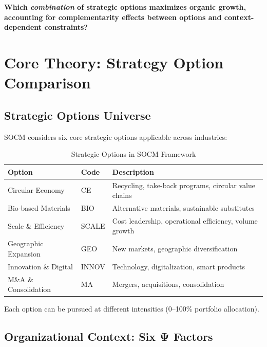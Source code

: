 \begin{tcolorbox}[colback=red!5!white, colframe=red!75!black,
    title=The Fundamental Question]
\textbf{Which \textit{combination} of strategic options maximizes organic growth, accounting for complementarity effects between options and context-dependent constraints?}
\end{tcolorbox}

\section{Core Theory: Strategy Option Comparison}
\label{sec:socm-theory}

\subsection{Strategic Options Universe}
\label{subsec:socm-options}

SOCM considers six core strategic options applicable across industries:

\begin{table}[htbp]
\centering
\caption{Strategic Options in SOCM Framework}
\label{tab:socm-options}
\renewcommand{\arraystretch}{1.4}
\begin{tabular}{@{}llp{6cm}@{}}
\toprule
\textbf{Option} & \textbf{Code} & \textbf{Description} \\
\midrule
Circular Economy & CE & Recycling, take-back programs, circular value chains \\
Bio-based Materials & BIO & Alternative materials, sustainable substitutes \\
Scale \& Efficiency & SCALE & Cost leadership, operational efficiency, volume growth \\
Geographic Expansion & GEO & New markets, geographic diversification \\
Innovation \& Digital & INNOV & Technology, digitalization, smart products \\
M\&A \& Consolidation & MA & Mergers, acquisitions, consolidation \\
\bottomrule
\end{tabular}
\end{table}

Each option can be pursued at different intensities (0--100\% portfolio allocation).

\subsection{Organizational Context: Six Ψ Factors}
\label{subsec:socm-context}

